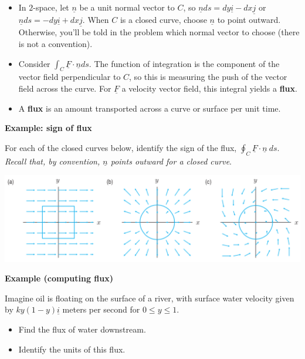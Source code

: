 \documentclass[12pt,letterpaper,noanswers]{exam}
\newcommand{\mb}[1]{\underline{#1}}
\begin{document}
\begin{tcolorbox}
\begin{itemize}
\itemsep0em
    \item In $2$-space, let $\mb n$ be a unit normal vector to $C$, so $\mb n ds = dy\mb i - dx\mb j$ or $\mb n ds = -dy\mb i + dx\mb j$.  When $C$ is a closed curve, choose $\mb n$ to point outward.  Otherwise, you'll be told in the problem which normal vector to choose (there is not a convention).
    \item Consider $\displaystyle \int_C \mb F\cdot \mb n ds$.  The function of integration is the component of the vector field perpendicular to $C$, so this is measuring the push of the vector field across the curve.  For $\mb F$ a velocity vector field, this integral yields a \textbf{flux}.
    \item A \textbf{flux} is an amount transported across a curve or surface per unit time.
\end{itemize}
\end{tcolorbox}

\noindent\textbf{Example: sign of flux}

For each of the closed curves below, identify the sign of the flux, $\oint_C \mb F\cdot \mb n\ ds$.  \emph{Recall that, by convention, $\mb n$ points outward for a closed curve}.

\includegraphics[scale=0.8]{img/C24p1.png}

\vspace{0.5in}


\noindent\textbf{Example (computing flux)}

Imagine oil is floating on the surface of a river, with surface water velocity given by $k y(1-y)\mb i$ meters per second for $0\leq y\leq 1$.

\begin{itemize}
\itemsep0em
    \item Find the flux of water downstream.  
    \item Identify the units of this flux.
\end{itemize}
\end{document}
